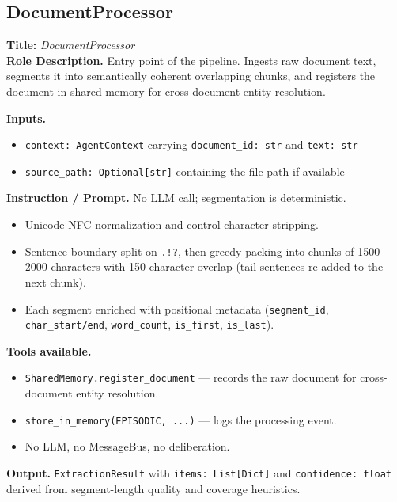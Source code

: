 \documentclass{article}
\begin{document}
\newpage
\subsection{DocumentProcessor}
\label{app:doc_processor}

\begin{agentbox}
\textbf{Title:} \textit{DocumentProcessor}\\
\textbf{Role Description.} Entry point of the pipeline. Ingests raw
document text, segments it into semantically coherent overlapping
chunks, and registers the document in shared memory for cross-document
entity resolution.

\textbf{Inputs.}
\begin{itemize}[leftmargin=*,nosep]
\item \texttt{context: AgentContext} carrying \texttt{document\_id: str} and \texttt{text: str}
\item \texttt{source\_path: Optional[str]} containing the file path if available
\end{itemize}

\textbf{Instruction / Prompt.} No LLM call; segmentation is deterministic.
\begin{itemize}[leftmargin=*,nosep]
\item Unicode NFC normalization and control-character stripping.
\item Sentence-boundary split on \texttt{.!?}, then greedy packing into chunks of 1500--2000 characters with 150-character overlap (tail sentences re-added to the next chunk).
\item Each segment enriched with positional metadata (\texttt{segment\_id}, \texttt{char\_start/end}, \texttt{word\_count}, \texttt{is\_first}, \texttt{is\_last}).
\end{itemize}

\textbf{Tools available.}
\begin{itemize}[leftmargin=*,nosep]
\item \texttt{SharedMemory.register\_document} --- records the raw document for cross-document entity resolution.
\item \texttt{store\_in\_memory(EPISODIC, ...)} --- logs the processing event.
\item No LLM, no MessageBus, no deliberation.
\end{itemize}

\textbf{Output.} \texttt{ExtractionResult} with \texttt{items: List[Dict]} and \texttt{confidence: float} derived from segment-length quality and coverage heuristics.
\end{agentbox}
\end{document}
